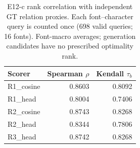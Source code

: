 \begin{table}[t]
\centering\small
\caption{E12-c rank correlation with independent GT relation proxies. Each font--character query is counted once (698 valid queries; 16 fonts). Font-macro averages; generation candidates have no prescribed optimality rank.}
\begin{tabular}{lrr}
\toprule
Scorer & Spearman $\rho$ & Kendall $\tau_b$ \\
\midrule
R1\_cosine & 0.8603 & 0.8092 \\
R1\_head & 0.8004 & 0.7406 \\
R2\_cosine & 0.8743 & 0.8268 \\
R2\_head & 0.8344 & 0.7806 \\
R3\_head & 0.8742 & 0.8268 \\
\bottomrule
\end{tabular}
\end{table}
